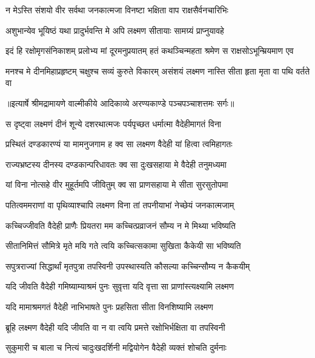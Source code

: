 \twolineshloka
{न मेऽस्ति संशयो वीर सर्वथा जनकात्मजा}
{विनष्टा भक्षिता वाप राक्षसैर्वनचारिभिः} %

\twolineshloka
{अशुभान्येव भूयिष्ठं यथा प्रादुर्भवन्ति मे}
{अपि लक्ष्मण सीतायाः सामग्र्यं प्राप्नुयावहे} %

\fourlineindentedshloka
{इदं हि रक्षोमृगसंनिकाशम्}
{प्रलोभ्य मां दूरमनुप्रयातम्}
{हतं कथञ्चिन्महता श्रमेण}
{स राक्षसोऽभून्म्रियमाण एव} %

\fourlineindentedshloka
{मनश्च मे दीनमिहाप्रहृष्टम्}
{चक्षुश्च सव्यं कुरुते विकारम्}
{असंशयं लक्ष्मण नास्ति सीता}
{हृता मृता वा पथि वर्तते वा} %


{॥इत्यार्षे श्रीमद्रामायणे वाल्मीकीये आदिकाव्ये अरण्यकाण्डे पञ्चपञ्चाशत्तमः सर्गः॥}


\twolineshloka
{स दृष्ट्वा लक्ष्मणं दीनं शून्ये दशरथात्मजः}
{पर्यपृच्छत धर्मात्मा वैदेहीमागतं विना} %

\twolineshloka
{प्रस्थितं दण्डकारण्यं या मामनुजगाम ह}
{क्व सा लक्ष्मण वैदेही यां हित्वा त्वमिहागतः} %

\twolineshloka
{राज्यभ्रष्टस्य दीनस्य दण्डकान्परिधावतः}
{क्व सा दुःखसहाया मे वैदेही तनुमध्यमा} %

\twolineshloka
{यां विना नोत्सहे वीर मुहूर्तमपि जीवितुम्}
{क्व सा प्राणसहाया मे सीता सुरसुतोपमा} %

\twolineshloka
{पतित्वममराणां वा पृथिव्याश्चापि लक्ष्मण}
{विना तां तपनीयाभां नेच्छेयं जनकात्मजाम्} %

\twolineshloka
{कच्चिज्जीवति वैदेही प्राणैः प्रियतरा मम}
{कच्चित्प्रव्राजनं सौम्य न मे मिथ्या भविष्यति} %

\twolineshloka
{सीतानिमित्तं सौमित्रे मृते मयि गते त्वयि}
{कच्चित्सकामा सुखिता कैकेयी सा भविष्यति} %

\twolineshloka
{सपुत्रराज्यां सिद्धार्थां मृतपुत्रा तपस्विनी}
{उपस्थास्यति कौसल्या कच्चिन्सौम्य न कैकयीम्} %

\twolineshloka
{यदि जीवति वैदेही गमिष्याम्याश्रमं पुनः}
{सुवृत्ता यदि वृत्ता सा प्राणांस्त्यक्ष्यामि लक्ष्मण} %

\twolineshloka
{यदि मामाश्रमगतं वैदेही नाभिभाषते}
{पुनः प्रहसिता सीता विनशिष्यामि लक्ष्मण} %

\twolineshloka
{ब्रूहि लक्ष्मण वैदेही यदि जीवति वा न वा}
{त्वयि प्रमत्ते रक्षोभिर्भक्षिता वा तपस्विनी} %

\twolineshloka
{सुकुमारी च बाला च नित्यं चादुःखदर्शिनी}
{मद्वियोगेन वैदेही व्यक्तं शोचति दुर्मनाः} %

